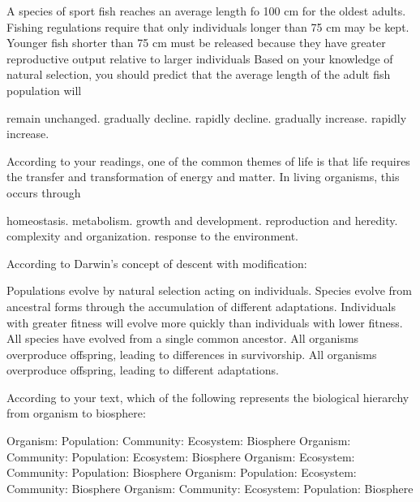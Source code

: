 \question
A species of sport fish reaches an average length fo 100 cm for the oldest adults. Fishing regulations require that only individuals longer than 75 cm may be kept.  Younger fish shorter than 75 cm must be released because they have greater reproductive output relative to larger individuals Based on your knowledge of natural selection, you should predict that the average length of the adult fish population will

\begin{choices}
\correctchoice remain unchanged. %
\choice gradually decline. %
\choice rapidly decline. %
\choice gradually increase. %
\choice rapidly increase. %
\end{choices}

\question
According to your readings, one of the common themes of life is that life requires the transfer and transformation of energy and matter.  In living organisms, this occurs through

\begin{choices}
\choice homeostasis. %
\correctchoice metabolism. %
\choice growth and development. %
\choice reproduction and heredity. %
\choice complexity and organization. %
\choice response to the environment. %
\end{choices}

\question
According to Darwin's concept of descent with modification:

\begin{choices}
\choice Populations evolve by natural selection acting on individuals. %
\correctchoice Species evolve from ancestral forms through the accumulation of different adaptations. %
\choice Individuals with greater fitness will evolve more quickly than individuals with lower fitness. %
\choice All species have evolved from a single common ancestor. %
\choice All organisms overproduce offspring, leading to differences in survivorship. %
\choice All organisms overproduce offspring, leading to different adaptations. %
\end{choices}

\question
According to your text, which of the following represents the biological hierarchy from organism to biosphere:

\begin{choices}
\correctchoice Organism: Population: Community: Ecosystem: Biosphere %
\choice Organism: Community: Population: Ecosystem: Biosphere %
\choice Organism: Ecosystem: Community: Population: Biosphere %
\choice Organism: Population: Ecosystem: Community: Biosphere %
\choice Organism: Community: Ecosystem: Population: Biosphere %
\end{choices}


